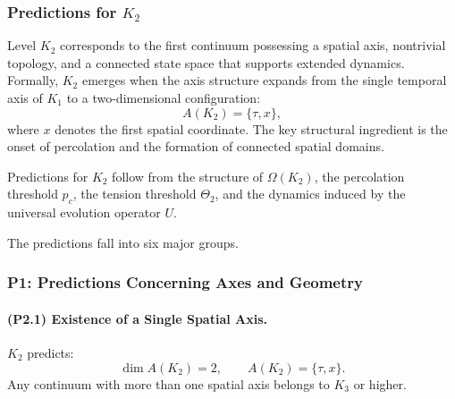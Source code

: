 

\subsubsection{Predictions for \texorpdfstring{$K_2$}{K_2}}
\label{sec:predictions-k2}

Level $K_2$ corresponds to the first continuum possessing a spatial axis,
nontrivial topology, and a connected state space that supports extended
dynamics. Formally, $K_2$ emerges when the axis structure expands from the
single temporal axis of $K_1$ to a two-dimensional configuration:
\[
A(K_2) = \{\tau, x\},
\]
where $x$ denotes the first spatial coordinate. The key structural ingredient
is the onset of percolation and the formation of connected spatial domains.

Predictions for $K_2$ follow from the structure of $\Omega(K_2)$,
the percolation threshold $p_c$, the tension threshold $\Theta_2$, and the
dynamics induced by the universal evolution operator $U$.

The predictions fall into six major groups.

\subsubsection{P1: Predictions Concerning Axes and Geometry}

\paragraph{(P2.1) Existence of a Single Spatial Axis.}
$K_2$ predicts:
\[
\dim A(K_2) = 2, \qquad A(K_2) = \{\tau, x\}.
\]
Any continuum with more than one spatial axis belongs to $K_3$ or higher.

